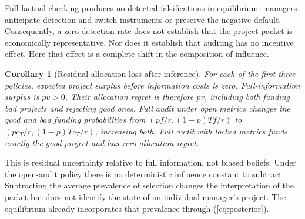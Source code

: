 \documentclass[11pt]{article}
\newtheorem{corollary}[theorem]{Corollary}
\begin{document}
Full factual checking produces no detected falsifications in equilibrium: managers anticipate detection and switch instruments or preserve the negative default. Consequently, a zero detection rate does not establish that the project packet is economically representative. Nor does it establish that auditing has no incentive effect. Here that effect is a complete shift in the composition of influence.
\begin{corollary}[Residual allocation loss after inference]\label{cor:regret}
For each of the first three policies, expected project surplus before information costs is zero. Full-information surplus is $pv>0$. Their allocation regret is therefore $pv$, including both funding bad projects and rejecting good ones. Full audit under open metrics changes the good and bad funding probabilities from $(pf/r,(1-p)Tf/r)$ to $(pc_T/r,(1-p)Tc_T/r)$, increasing both. Full audit with locked metrics funds exactly the good project and has zero allocation regret.
\end{corollary}
This is residual uncertainty relative to full information, not biased beliefs. Under the open-audit policy there is no deterministic influence constant to subtract. Subtracting the average prevalence of selection changes the interpretation of the packet but does not identify the state of an individual manager's project. The equilibrium already incorporates that prevalence through (\ref{eq:posterior}).
\end{document}
